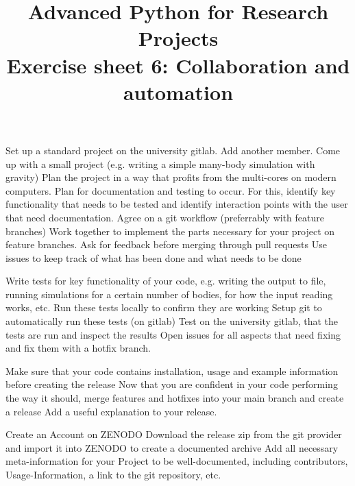 \documentclass[]{erlangen-problemset}
\title{{\Large Advanced Python for Research Projects} \\[0.3cm] 
Exercise sheet 6: Collaboration and automation}
\begin{document}


\begin{problem}[title={Working with other members}]
\noindent
\Question Set up a standard project on the university gitlab.
\Question Add another member.
\Question Come up with a small project (e.g. writing a simple many-body simulation with gravity)
\Question Plan the project in a way that profits from the multi-cores on modern computers. Plan for documentation and testing to occur. 
For this, identify key functionality that needs to be tested and identify interaction points with the user that need documentation.
\Question Agree on a git workflow (preferrably with feature branches)
\Question Work together to implement the parts necessary for your project on feature branches. Ask for feedback before merging through pull requests
\Question Use issues to keep track of what has been done and what needs to be done
\end{problem}

\begin{problem}[title={Automated testing}]
\noindent
\Question Write tests for key functionality of your code, e.g. writing the output to file, running simulations for a certain number of bodies, for how the input reading works, etc.
\Question Run these tests locally to confirm they are working
\Question Setup git to automatically run these tests (on gitlab)
\Question Test on the university gitlab, that the tests are run and inspect the results
\Question Open issues for all aspects that need fixing and fix them with a hotfix branch. 
\end{problem}

\begin{problem}[title={Creating a release}]
\noindent
\Question Make sure that your code contains installation, usage and example information before creating the release
\Question Now that you are confident in your code performing the way it should, merge features and hotfixes into your main branch and create a release
\Question Add a useful explanation to your release.
\end{problem}

\begin{problem}[title={FAIR principles}]
\noindent
\Question Create an Account on ZENODO
\Question Download the release zip from the git provider and import it into ZENODO to create a documented archive
\Question Add all necessary meta-information for your Project to be well-documented, including contributors, Usage-Information, a link to the git repository, etc. 
\end{problem}
\end{document}
